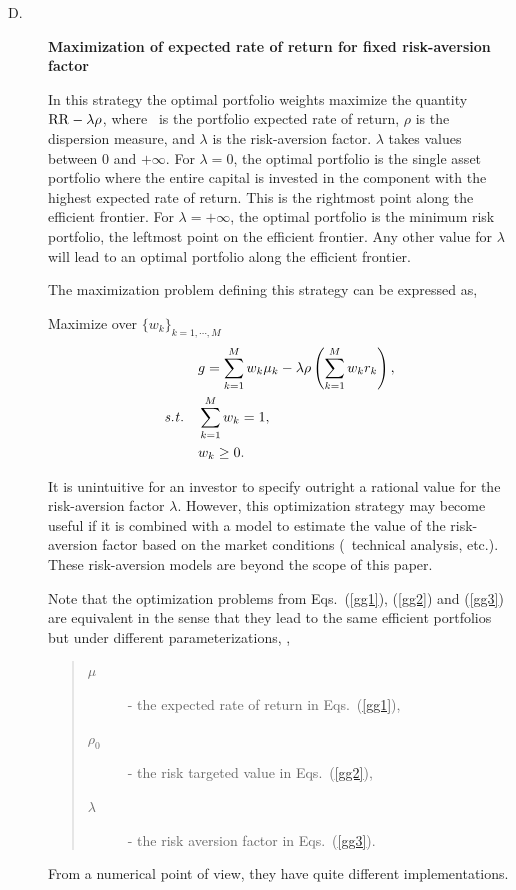 \begin{description}
  \item[D.\label{RiskAverse}] {\bf Maximization of expected rate of return for fixed risk-aversion factor}

    In this strategy the optimal portfolio weights maximize the quantity ${\rm RR}-\lambda\rho$,
    where \RR\ is the portfolio expected rate of return, $\rho$ is the dispersion measure,
    and $\lambda$ is the risk-aversion factor. $\lambda$ takes values between $0$ and $+\infty$.
    For $\lambda=0$, the optimal portfolio is the single asset portfolio where the entire capital is invested in the
    component with the highest expected rate of return.
    This is the rightmost point along the efficient frontier.
    For $\lambda=+\infty$, the optimal portfolio is the minimum risk portfolio, the leftmost point on the efficient frontier.
    Any other value for $\lambda$ will lead to an optimal portfolio along the efficient frontier.

    The maximization problem defining this strategy can be expressed as,

    \bigskip
    \noindent Maximize over $\{w_k\}_{k=1,\cdots,M}$
    \begin{subequations}\label{gg3}
    \begin{align}
        & g =  \sum_{k=1}^M w_k \mu_k - \lambda\rho\left(\sum_{k=1}^M w_k r_k \right), \label{gg3a} \\
        \st & \sum_{k=1}^M w_k = 1, \label{gg3b} \\
            & w_k \ge 0. \label{gg3c}
    \end{align}
    \end{subequations}

    \noindent It is unintuitive for an investor to specify outright a rational value for the risk-aversion factor $\lambda$.
    However, this optimization strategy may become useful if it is combined with a model to estimate the
    value of the risk-aversion factor based on the market conditions (\eg\ technical analysis, etc.).
    These risk-aversion models are beyond the scope of this paper.

    Note that the optimization problems from Eqs.~(\ref{gg1}), (\ref{gg2}) and (\ref{gg3}) are equivalent
    in the sense that they lead to the same efficient portfolios but under different parameterizations, \ie,
    \begin{quote}
    \begin{description}
        \item[$\mu$] - the expected rate of return in Eqs.~(\ref{gg1}),
        \item[$\rho_0$] - the risk targeted value in Eqs.~(\ref{gg2}),
        \item[$\lambda$] - the risk aversion factor in Eqs.~(\ref{gg3}).
    \end{description}
    \end{quote}
    From a numerical point of view, they have quite different implementations.



\end{description}
